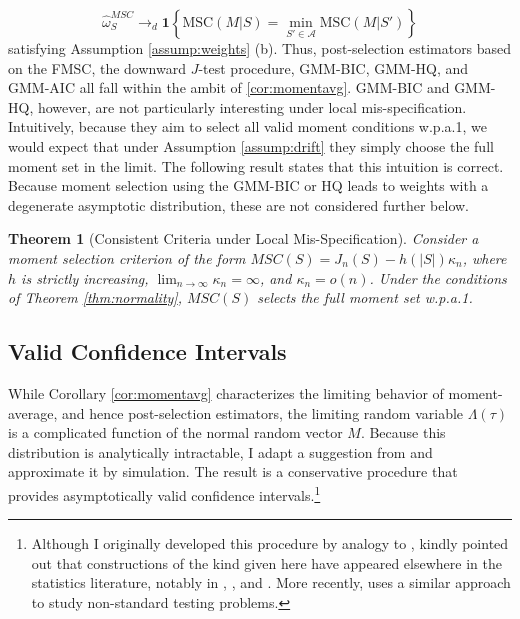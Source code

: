 \documentclass[12pt]{article}
\newtheorem{thm}{Theorem}[section]
\theoremstyle{definition}
\begin{document}
	$$\widehat{\omega}_S^{MSC} \rightarrow_d \mathbf{1}\left\{\mbox{MSC}(M|S) = \min_{S'\in \mathcal{A}} \mbox{MSC}(M|S')\right\}$$ 
satisfying Assumption \ref{assump:weights} (b). Thus, post-selection estimators based on the FMSC, the downward $J$-test procedure, GMM-BIC, GMM-HQ, and GMM-AIC all fall within the ambit of \ref{cor:momentavg}. GMM-BIC and GMM-HQ, however, are not particularly interesting under local mis-specification. Intuitively, because they aim to select all valid moment conditions w.p.a.1, we would expect that under Assumption \ref{assump:drift} they simply choose the full moment set in the limit. The following result states that this intuition is correct. Because moment selection using the GMM-BIC or HQ leads to weights with a degenerate asymptotic distribution, these  are not considered further below. 
\begin{thm}[Consistent Criteria under Local Mis-Specification]
\label{pro:andrews}
Consider a moment selection criterion of the form $MSC(S) = J_n(S) - h(|S|)\kappa_n$, where $h$ is strictly increasing,  $\lim_{n\rightarrow \infty}\kappa_n = \infty$, and $\kappa_n = o(n)$. Under the conditions of Theorem \ref{thm:normality}, $MSC(S)$ selects the full moment set w.p.a.1.
\end{thm}


\subsection{Valid Confidence Intervals}
While Corollary \ref{cor:momentavg} characterizes the limiting behavior of moment-average, and hence post-selection estimators, the limiting random variable $\Lambda(\tau)$ is a complicated function of the normal random vector $M$. Because this distribution is analytically intractable, I adapt a suggestion from \cite{ClaeskensHjortbook} and approximate it by simulation. The result is a conservative procedure that provides asymptotically valid confidence intervals.\footnote{Although I originally developed this procedure by analogy to \cite{ClaeskensHjortbook}, \cite{Leeb} kindly pointed out that constructions of the kind given here have appeared elsewhere in the statistics literature, notably in \cite{Loh1985}, \cite{Berger1994}, and \cite{Silvapulle1996}. More recently, \cite{McCloskey} uses a similar approach to study non-standard testing problems.}
 
\end{document}
